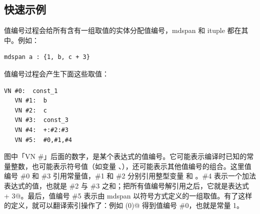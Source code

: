 \subsection*{快速示例}

值编号过程会给所有含有一组取值的实体分配值编号，mdspan 和 ituple 都在其中。例如：

\begin{lstlisting}[language=croqtile,caption={一个形状表达式}]
mdspan a : {1, b, c + 3}
\end{lstlisting}

值编号过程会产生下面这些取值：

\begin{lstlisting}[language=croqtile,caption={对应的值编号图}]
   VN #0:  const_1
   VN #1:  b
   VN #2:  c
   VN #3:  const_3
   VN #4:  +:#2:#3
   VN #5:  #0,#1,#4
\end{lstlisting}

图中「VN \#」后面的数字，是某个表达式的值编号。它可能表示编译时已知的常量整数，也可能表示符号值（如变量 \co@a@、\co@b@），还可能表示其他值编号的组合。这里值编号 \#0 和 \#3 引用常量值，\#1 和 \#2 分别引用整型变量 \co@b@ 和 \co@c@。\#4 表示一个加法表达式的值，也就是 \#2 与 \#3 之和；把所有值编号解引用之后，它就是表达式 \co@c + 3@。最后，值编号 \#5 表示由 mdspan \co@a@ 以符号方式定义的一组取值。有了这样的定义，就可以翻译索引操作了：例如 \co@a(0)@ 得到值编号 \#0，也就是常量 1。
